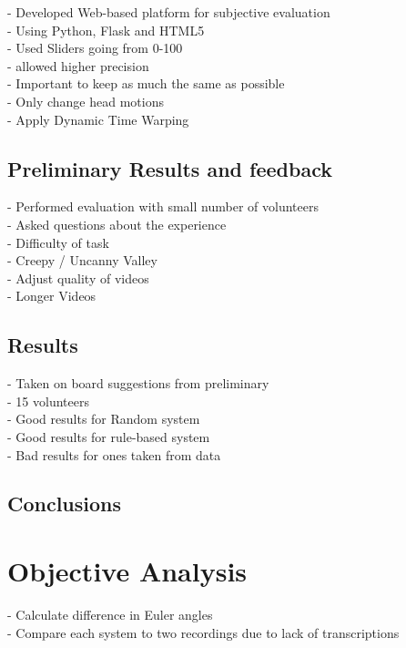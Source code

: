 \documentclass[bsc,frontabs,twoside,singlespacing,parskip]{infthesis}
\begin{document}
- Developed Web-based platform for subjective evaluation\\
- Using Python, Flask and HTML5\\
- Used Sliders going from 0-100 \\
- allowed higher precision \\


- Important to keep as much the same as possible\\
- Only change head motions\\
- Apply Dynamic Time Warping\\ 

\subsection{Preliminary Results and feedback}

- Performed evaluation with small number of volunteers \\

- Asked questions about the experience \\
- Difficulty of task \\
- Creepy / Uncanny Valley \\
- Adjust quality of videos \\
- Longer Videos \\ 

\subsection{Results}

- Taken on  board suggestions from preliminary \\
- 15 volunteers \\
- Good results for Random system \\
- Good results for rule-based system \\
- Bad results for ones taken from data \\

\subsection{Conclusions}


\section{Objective Analysis}

- Calculate difference in Euler angles\\
- Compare each system to two recordings due to lack of transcriptions\\
\end{document}
